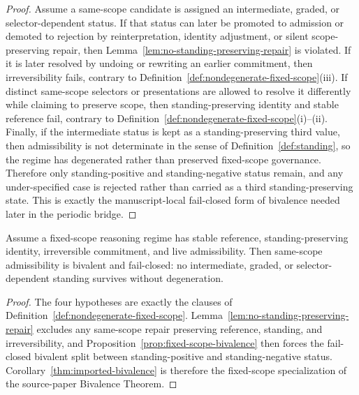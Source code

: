 \begin{proof}
Assume a same-scope candidate is assigned an intermediate, graded, or selector-dependent status. If that status can later be promoted to admission or demoted to rejection by reinterpretation, identity adjustment, or silent scope-preserving repair, then Lemma~\ref{lem:no-standing-preserving-repair} is violated. If it is later resolved by undoing or rewriting an earlier commitment, then irreversibility fails, contrary to Definition~\ref{def:nondegenerate-fixed-scope}(iii). If distinct same-scope selectors or presentations are allowed to resolve it differently while claiming to preserve scope, then standing-preserving identity and stable reference fail, contrary to Definition~\ref{def:nondegenerate-fixed-scope}(i)--(ii). Finally, if the intermediate status is kept as a standing-preserving third value, then admissibility is not determinate in the sense of Definition~\ref{def:standing}, so the regime has degenerated rather than preserved fixed-scope governance. Therefore only standing-positive and standing-negative status remain, and any under-specified case is rejected rather than carried as a third standing-preserving state. This is exactly the manuscript-local fail-closed form of bivalence needed later in the periodic bridge.
\end{proof}

\begin{manualcorollary}
\label{thm:imported-bivalence}
Assume a fixed-scope reasoning regime has stable reference, standing-preserving identity, irreversible commitment, and live admissibility. Then same-scope admissibility is bivalent and fail-closed: no intermediate, graded, or selector-dependent standing survives without degeneration.
\end{manualcorollary}

\begin{proof}
The four hypotheses are exactly the clauses of Definition~\ref{def:nondegenerate-fixed-scope}. Lemma~\ref{lem:no-standing-preserving-repair} excludes any same-scope repair preserving reference, standing, and irreversibility, and Proposition~\ref{prop:fixed-scope-bivalence} then forces the fail-closed bivalent split between standing-positive and standing-negative status. Corollary~\ref{thm:imported-bivalence} is therefore the fixed-scope specialization of the source-paper Bivalence Theorem.
\end{proof}

